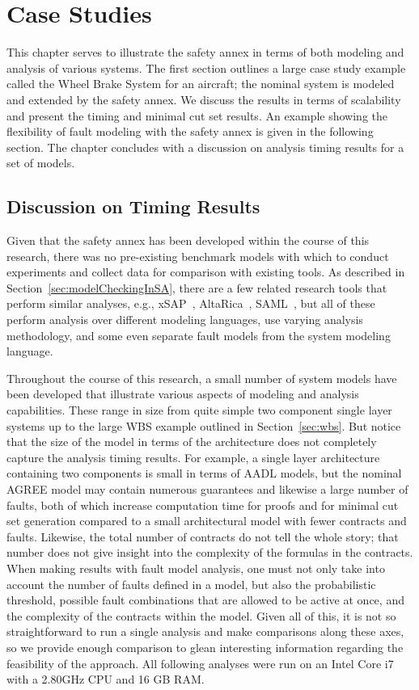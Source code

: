 \chapter{Case Studies}
\label{chap:caseStudies}
This chapter serves to illustrate the safety annex in terms of both modeling and analysis of various systems. The first section outlines a large case study example called the Wheel Brake System for an aircraft; the nominal system is modeled and extended by the safety annex. We discuss the results in terms of scalability and present the timing and minimal cut set results. An example showing the flexibility of fault modeling with the safety annex is given in the following section. The chapter concludes with a discussion on analysis timing results for a set of models. 




\section{Discussion on Timing Results}
\label{sec:timing}
Given that the safety annex has been developed within the course of this research, there was no pre-existing benchmark models with which to conduct experiments and collect data for comparison with existing tools. As described in Section~\ref{sec:modelCheckingInSA}, there are a few related research tools that perform similar analyses, e.g., xSAP~\cite{DBLP:conf/tacas/BittnerBCCGGMMZ16}, AltaRica~\cite{signoret1998altarica}, SAML~\cite{Gudemann:2010:FQQ:1909626.1909813}, but all of these perform analysis over different modeling languages, use varying analysis methodology, and some even separate fault models from the system modeling language.

Throughout the course of this research, a small number of system models have been developed that illustrate various aspects of modeling and analysis capabilities. These range in size from quite simple two component single layer systems up to the large WBS example outlined in Section~\ref{sec:wbs}. But notice that the size of the model in terms of the architecture does not completely capture the analysis timing results. For example, a single layer architecture containing two components is small in terms of AADL models, but the nominal AGREE model may contain numerous guarantees and likewise a large number of faults, both of which increase computation time for proofs and for minimal cut set generation compared to a small architectural model with fewer contracts and faults. Likewise, the total number of contracts do not tell the whole story; that number does not give insight into the complexity of the formulas in the contracts. When making results with fault model analysis, one must not only take into account the number of faults defined in a model, but also the probabilistic threshold, possible fault combinations that are allowed to be active at once, and the complexity of the contracts within the model. Given all of this, it is not so straightforward to run a single analysis and make comparisons along these axes, so we provide enough comparison to glean interesting information regarding the feasibility of the approach. All following analyses were run on an Intel Core i7 with a 2.80GHz CPU and 16 GB RAM. 

